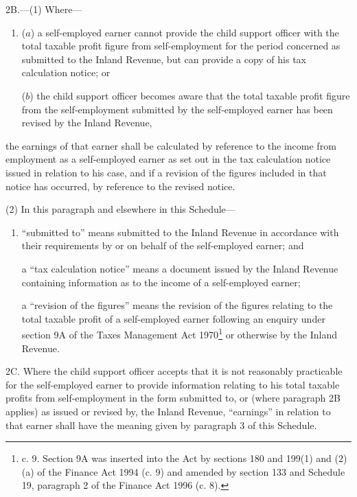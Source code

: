 \documentclass[12pt,a4paper]{article}
\begin{document}

\medskip

2B.—(1) Where—
\begin{enumerate}\item[]
($a$) a self-employed earner cannot provide the child support officer with the total taxable profit figure from self-employment for the period concerned as submitted to the Inland Revenue, but can provide a copy of his tax calculation notice; or

($b$) the child support officer becomes aware that the total taxable profit figure from the self-employment submitted by the self-employed earner has been revised by the Inland Revenue,
\end{enumerate}
the earnings of that earner shall be calculated by reference to the income from employment as a self-employed earner as set out in the tax calculation notice issued in relation to his case, and if a revision of the figures included in that notice has occurred, by reference to the revised notice.

(2) In this paragraph and elsewhere in this Schedule—
\begin{enumerate}\item[]
“submitted to” means submitted to the Inland Revenue in accordance with their requirements by or on behalf of the self-employed earner; and

a “tax calculation notice” means a document issued by the Inland Revenue containing information as to the income of a self-employed earner;

a “revision of the figures” means the revision of the figures relating to the total taxable profit of a self-employed earner following an enquiry under section 9A of the Taxes Management Act 1970\footnote{ c. 9. Section 9A was inserted into the Act by sections 180 and 199(1) and (2)(a) of the Finance Act 1994 (c. 9) and amended by section 133 and Schedule 19, paragraph 2 of the Finance Act 1996 (c. 8).} or otherwise by the Inland Revenue.
\end{enumerate}


\medskip

2C.  Where the child support officer accepts that it is not reasonably practicable for the self-employed earner to provide information relating to his total taxable profits from self-employment in the form submitted to, or (where paragraph 2B applies) as issued or revised by, the Inland Revenue, “earnings” in relation to that earner shall have the meaning given by paragraph 3 of this Schedule.
\end{document}
